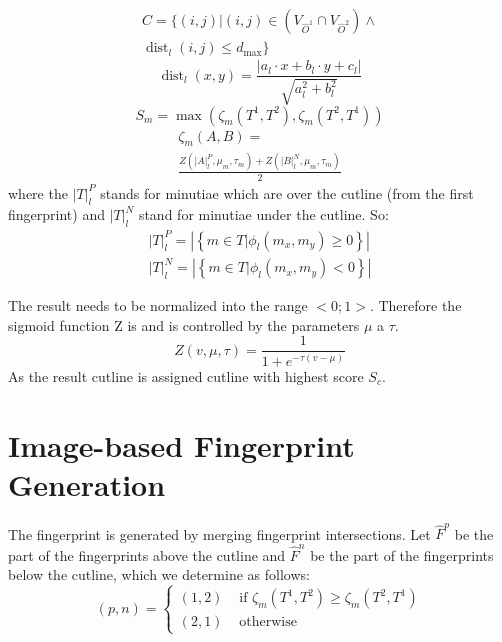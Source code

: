\begin{equation}
  \begin{split}
      C=\{(i, j) |(i, j) \in\left(V_{\hat{O}^{1}} \cap V_{\hat{O}^{2}}\right) \wedge \\\operatorname{dist}_{l}(i, j) \leq d_{\max }\}
  \end{split}
 \end{equation}
 \begin{equation}
     \operatorname{dist}_{l}(x, y)=\frac{\left|a_{l} \cdot x+b_{l} \cdot y+c_{l}\right|}{\sqrt{a_{l}^{2}+b_{l}^{2}}}
 \end{equation}
 \begin{equation}
     S_{m}=\max \left(\zeta_{m}\left(T^{1}, T^{2}\right), \zeta_{m}\left(T^{2}, T^{1}\right)\right)
 \end{equation}
 \begin{equation}
 \begin{split}
     \zeta_{m}(A, B)=\\\frac{Z\left(|A|_{l}^{P}, \mu_{m}, \tau_{m}\right)+Z\left(|B|_{l}^{N}, \mu_{m}, \tau_{m}\right)}{2}
 \end{split}
 \end{equation}
 where the $|T|_{l}^{P}$ stands for minutiae which are over the cutline (from the first fingerprint) and $|T|_{l}^{N}$ stand for minutiae under the cutline. So:\cite{morphing_paper}
 \begin{equation}
     \begin{array}{l}
        |T|_{l}^{P}=\left|\left\{m \in T | \phi_{l}\left(m_{x}, m_{y}\right) \geq 0\right\}\right| \\
        |T|_{l}^{N}=\left|\left\{m \in T | \phi_{l}\left(m_{x}, m_{y}\right)<0\right\}\right|
    \end{array}
 \end{equation}

The result needs to be normalized into the range $<0;1>$. Therefore the sigmoid function Z is and is controlled by the parameters $\mu$ a $\tau$. \cite{morphing_paper}
\begin{equation}
    Z(v, \mu, \tau)=\frac{1}{1+e^{-\tau(v-\mu)}}
\end{equation}
As the result cutline is assigned cutline with highest score $S_c$. \cite{morphing_paper}
 
\label{imageBased1}
\section{Image-based Fingerprint Generation} \label{picgen}
The fingerprint is generated by merging fingerprint intersections. Let $ \hat{F}^{p} $ be the part of the fingerprints above the cutline and $ \hat{F}^{n} $ be the part of the fingerprints below the cutline, which we determine as follows: \cite{morphing_paper}
\begin{equation}
    (p, n)=\left\{\begin{array}{ll}
    (1,2) & \text { if } \zeta_{m}\left(T^{1}, T^{2}\right) \geq \zeta_{m}\left(T^{2}, T^{1}\right) \\
    (2,1) & \text { otherwise }
    \end{array}\right.
\end{equation}


